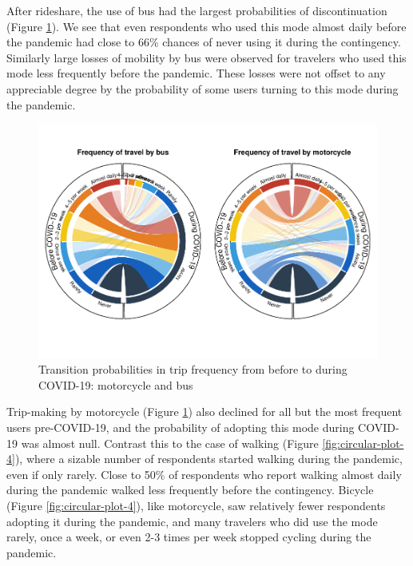 \documentclass[]{elsarticle} %
\begin{document}
After rideshare, the use of bus had the largest probabilities of
discontinuation (Figure \ref{fig:circular-plot-3}). We see that even
respondents who used this mode almost daily before the pandemic had
close to 66\% chances of never using it during the contingency.
Similarly large losses of mobility by bus were observed for travelers
who used this mode less frequently before the pandemic. These losses
were not offset to any appreciable degree by the probability of some
users turning to this mode during the pandemic.

\begin{figure}
\centering
\includegraphics{Frequency-of-Travel-by-Mode-COVID-19-Bangladesh_files/figure-latex/circular-plots-transition-probabilities-3-1.pdf}
\caption{\label{fig:circular-plot-3}Transition probabilities in trip
frequency from before to during COVID-19: motorcycle and bus}
\end{figure}

Trip-making by motorcycle (Figure \ref{fig:circular-plot-3}) also
declined for all but the most frequent users pre-COVID-19, and the
probability of adopting this mode during COVID-19 was almost null.
Contrast this to the case of walking (Figure \ref{fig:circular-plot-4}),
where a sizable number of respondents started walking during the
pandemic, even if only rarely. Close to 50\% of respondents who report
walking almost daily during the pandemic walked less frequently before
the contingency. Bicycle (Figure \ref{fig:circular-plot-4}), like
motorcycle, saw relatively fewer respondents adopting it during the
pandemic, and many travelers who did use the mode rarely, once a week,
or even 2-3 times per week stopped cycling during the pandemic.
\end{document}
